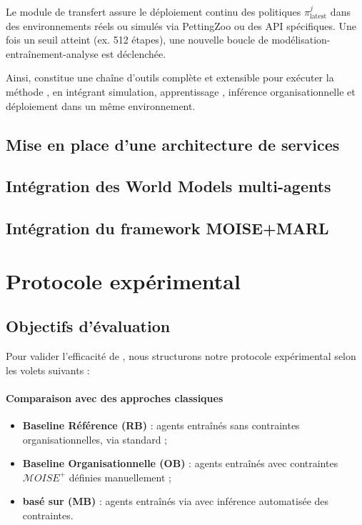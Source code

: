 Le module de transfert assure le déploiement continu des politiques $\pi^j_{\text{latest}}$ dans des environnements réels ou simulés via PettingZoo ou des API spécifiques. Une fois un seuil atteint (ex. 512 étapes), une nouvelle boucle de modélisation-entraînement-analyse est déclenchée.

Ainsi,  constitue une chaîne d'outils complète et extensible pour exécuter la méthode , en intégrant simulation, apprentissage , inférence organisationnelle et déploiement dans un même environnement.


\section{Mise en place d'une architecture de services}
\section{Intégration des World Models multi-agents}
\section{Intégration du framework MOISE+MARL}


\chapter{Protocole expérimental}

\section{Objectifs d'évaluation}

Pour valider l'efficacité de , nous structurons notre protocole expérimental selon les volets suivants :

\subsubsection{Comparaison avec des approches classiques}

\begin{itemize}
    \item \textbf{Baseline Référence (RB)} : agents entraînés sans contraintes organisationnelles, via  standard ;
    \item \textbf{Baseline Organisationnelle (OB)} : agents entraînés avec contraintes $\mathcal{M}OISE^+$ définies manuellement ;
    \item \textbf{ basé sur  (MB)} : agents entraînés via  avec inférence automatisée des contraintes.
\end{itemize}


